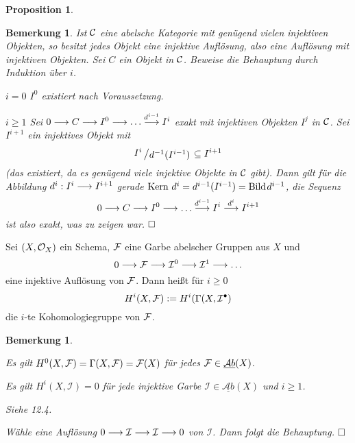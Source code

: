 \documentclass[11pt]{book}
\newtheorem{proposition}[theorem]{Proposition}
\newtheorem{remark}[theorem]{Bemerkung}
\theoremstyle{nonumberbreak}
\newenvironment{defin}[1][]{\ifthenelse{\equal{#1}{}}{\definition}{\definition[#1]}\rm}{\enddefinition}
\newenvironment{pr}[1][]{\ifthenelse{\equal{#1}{}}{\proof}{\proof[#1]}\rm}{\endproof}
\newcommand{\AbX}{\underline{\mathcal{A}b}(X)}
\newcommand{\kernel}{\mathrm{Kern}\ }
\newcommand{\slant}[2]{{\raisebox{.1em}{$#1$}\left/\raisebox{-.1em}{$#2$}\right.}}
\begin{document}
\begin{spacing}{1.4}
\begin{proposition}
\end{proposition}


\begin{remark}
Ist $\mathcal{C}$ eine abelsche Kategorie mit genügend vielen injektiven Objekten, so besitzt jedes Objekt eine injektive Auflösung, also eine Auflösung mit injektiven Objekten.
\begin{pr}
Sei $C$ ein Objekt in $\mathcal{C}$. Beweise die Behauptung durch Induktion über $i$.
\begin{compactenum}
\item[$i=0$] $I^{0}$ existiert nach Voraussetzung.
\item[$i \geqslant 1$] Sei $0 \longrightarrow C \longrightarrow I^{0} \longrightarrow \ldots \overset{d^{i-1}}{\longrightarrow} I^{i}$ exakt mit injektiven Objekten $I^{j}$ in $\mathcal{C}$. Sei $I^{i+1}$ ein injektives Objekt mit 
$$\slant{I^{i}}{d^{-1}(I^{i-1})} \subseteq I^{i+1}$$
(das existiert, da es genügend viele injektive Objekte in $\mathcal{C}$ gibt). Dann gilt für die Abbildung $d^{i}: I^{i} \longrightarrow I^{i+1}$ gerade $\kernel d^{i} = d^{i-1}(I^{i-1})=\mathrm{Bild} \hspace{1.0pt} d^{i-1}$, die Sequenz 
$$0 \longrightarrow C \longrightarrow I^{0} \longrightarrow \ldots \overset{d^{i-1}}{\longrightarrow} I^{i} \overset{d^{i}}{\longrightarrow} I^{i+1}$$
ist also exakt, was zu zeigen war. $\hfill \Box$

\end{compactenum}
\end{pr}

\end{remark}

\newcommand{\I}{\mathcal{I}}

\begin{defin}

Sei $(X, \mathcal{O}_X)$ ein Schema, $\mathcal{F}$ eine Garbe abelscher Gruppen aus $X$ und 
$$0 \la \F \la \I^{0} \la \I^{1} \la \ldots $$
eine injektive Auflösung von $\mathcal{F}$. Dann heißt für $i \geqslant 0$
$$H^{i}(X, \F) := H^{i}(\Gamma(X, \I^{\bullet})$$
die $i$-te Kohomologiegruppe von $\mathcal{F}$.
\end{defin}

\begin{remark}
\begin{compactenum}
\item Es gilt $H^{0}(X, \mathcal{F}) = \Gamma(X, \mathcal{F}) = \mathcal{F}(X)$ für jedes $\F \in \AbX$. 
\item Es gilt $H^{i}(X, \I)=0$ für jede injektive Garbe $\I \in \AbX$ und $i \geqslant 1$. 
\end{compactenum}
\begin{pr}
\begin{compactenum}
\item Siehe 12.4.
\item Wähle eine Auflösung $0 \la \I \la \I \la 0$ von $\I$. Dann folgt die Behauptung. $\hfill \Box$
\end{compactenum}
\end{pr}
\end{remark}



\end{spacing}
\end{document}
